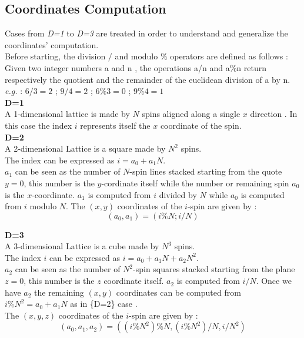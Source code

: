 \documentclass[11pt,a4paper]{article}
\begin{document}
\subsection*{Coordinates Computation}

Cases from \textit{D=1} to \textit{D=3} are treated in order to understand and generalize the coordinates’ computation. \\
Before starting, the division $/$ and modulo $\%$ operators are defined as follows : \\
Given two integer numbers a and n , the operations a/n and a\%n return respectively the quotient and the remainder of the euclidean division of a by n. \\ 
\textit{e.g.} : $6/3=2$ ; $9/4=2$ ; $6\%3=0$ ; $9\%4=1$ \\

\vspace{0.1cm} 
\textbf{D=1} \\
A 1-dimensional lattice is made by $N$ spins aligned along a single $x$ direction .
In this case the index $i$ represents itself the $x$ coordinate of the spin.\\

\textbf{D=2} \\
A 2-dimensional Lattice is a square made by $N^2$ spins.\\
The index can be expressed as $i = a_0 + a_1N$. \\
$a_1$ can be seen as the number of $N$-spin lines stacked starting from the quote $y=0$, this number is
the $y$-cordinate itself while the number or remaining spin $a_0$ is the $x$-coordinate. 
$a_1$ is computed from $i$ divided by $N$ while $a_0$ is computed from $i$ modulo $N$.
The $(x,y)$ coordinates of the $i$-spin are given by : $$(a_0,a_1)=(i\%N ; i/N)$$ 


\textbf{D=3} \\
A 3-dimensional Lattice is a cube made by $N^{3}$ spins. \\  
The index $i$ can be expressed as $i = a_0 + a_1N + a_2N^2$. \\
$a_2$ can be seen as the number of $N^2$-spin squares stacked starting from the plane $z=0$, this number is 
the $z$ coordinate itself. $a_2$ is computed from $i/N$.
Once we have $a_2$ the remaining $(x,y)$ coordinates can be computed from \\ $i\%N^2 = a_0 + a_1N$ as in \{D=2\} case .\\
The $(x,y,z)$ coordinates of the $i$-spin are given by : $$(a_0,a_1,a_2)=\left( (i\%N^2)\%N , (i\%N^2)/N , i/N^2 \right)$$ 
\end{document}
